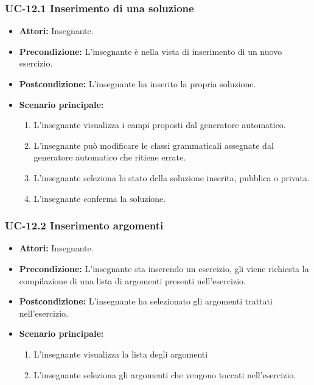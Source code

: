 \subsubsection{UC-12.1 Inserimento di una soluzione}
\begin{itemize}
\item \textbf{Attori: }Insegnante.
\item \textbf{Precondizione: }L'insegnante è nella vista di inserimento di un nuovo esercizio.
\item \textbf{Postcondizione: }L'insegnante ha inserito la propria soluzione.
\item \textbf{Scenario principale: }
		\begin{enumerate} 
		\item L'insegnante visualizza i campi proposti dal generatore automatico. 
		\item L'insegnante può modificare le classi grammaticali assegnate dal generatore automatico che ritiene errate.
		\item L'insegnante seleziona lo stato della soluzione inserita, pubblica o privata.
		\item L'insegnante conferma la soluzione.
		\end{enumerate}	
\end{itemize}

\subsubsection{UC-12.2 Inserimento argomenti}
\begin{itemize}
\item \textbf{Attori: }Insegnante.

\item \textbf{Precondizione:} L'insegnante sta inserendo un esercizio, gli viene richiesta la compilazione di una lista di argomenti presenti nell'esercizio.
\item \textbf{Postcondizione:} L'insegnante ha selezionato gli argomenti trattati nell'esercizio.
\item \textbf{Scenario principale: }
		\begin{enumerate}
		\item L'insegnante visualizza la lista degli argomenti
		\item L'insegnante seleziona gli argomenti che vengono toccati nell'esercizio. 
		\end{enumerate}
\end{itemize}				

